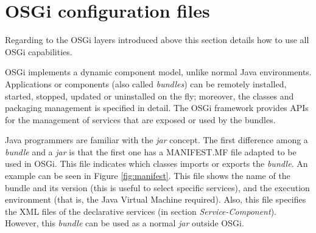 \section{OSGi configuration files}
Regarding to the OSGi layers introduced above this section details how to use all OSGi capabilities. 

OSGi implements a dynamic component model, unlike normal Java
environments. Applications or components (also called
\emph{bundles}) can be remotely installed, started, stopped, updated
or uninstalled on the fly; moreover, the classes and
packaging management is specified in detail. The OSGi framework provides
APIs for the management of services that are exposed or used by the
bundles.

Java programmers are familiar with the {\em jar} concept. The first difference among a {\em bundle} and a {\em jar} is that the first one has a MANIFEST.MF file adapted to be used in OSGi. This file indicates which classes imports or exports the {\em bundle}. An example can be seen in Figure \ref{fig:manifest}. This file shows the name of the bundle and its version (this is useful to select specific services), and the execution environment (that is, the Java Virtual Machine required). Also, this file specifies the XML files of the declarative services (in section {\em Service-Component}). However, this {\em bundle} can be used as a normal {\em jar} outside OSGi.

